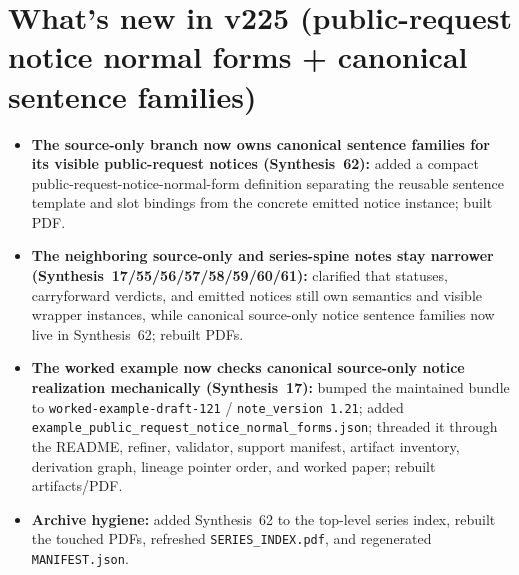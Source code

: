 \documentclass[11pt]{article}
\begin{document}
\section{What's new in v225 (public-request notice normal forms + canonical sentence families)}
\begin{itemize}[leftmargin=*]
\item \textbf{The source-only branch now owns canonical sentence families for its visible public-request notices (Synthesis~62):} added a compact public-request-notice-normal-form definition separating the reusable sentence template and slot bindings from the concrete emitted notice instance; built PDF.
\item \textbf{The neighboring source-only and series-spine notes stay narrower (Synthesis~17/55/56/57/58/59/60/61):} clarified that statuses, carryforward verdicts, and emitted notices still own semantics and visible wrapper instances, while canonical source-only notice sentence families now live in Synthesis~62; rebuilt PDFs.
\item \textbf{The worked example now checks canonical source-only notice realization mechanically (Synthesis~17):} bumped the maintained bundle to \texttt{worked-example-draft-121} / \texttt{note\_version 1.21}; added \texttt{example\_public\_request\_notice\_normal\_forms.json}; threaded it through the README, refiner, validator, support manifest, artifact inventory, derivation graph, lineage pointer order, and worked paper; rebuilt artifacts/PDF.
\item \textbf{Archive hygiene:} added Synthesis~62 to the top-level series index, rebuilt the touched PDFs, refreshed \texttt{SERIES\_INDEX.pdf}, and regenerated \texttt{MANIFEST.json}.
\end{itemize}
\end{document}
